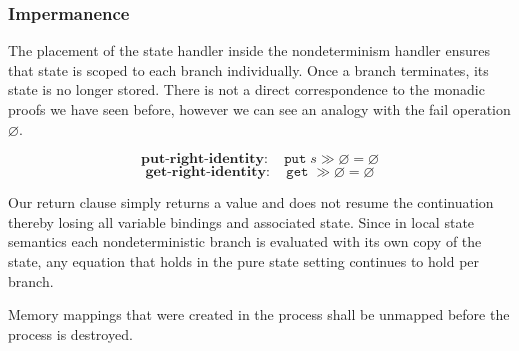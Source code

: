 \documentclass[logo,bsc,singlespacing,parskip]{infthesis}
\begin{document}
\subsubsection{Impermanence} 
The placement of the state handler inside the nondeterminism handler ensures that state is scoped to each branch individually. Once a branch terminates, its state is no longer stored. There is not a direct correspondence to the monadic proofs we have seen before, however we can see an analogy with the fail operation $\varnothing$. 

\[
\textbf{put-right-identity}: \quad \texttt{put}\;s \gg \varnothing = \varnothing
\]
\vspace{-1em}
\[
\textbf{get-right-identity}: \quad \texttt{get}\; \gg \varnothing = \varnothing
\]

Our return clause  simply returns a value and does not resume the continuation thereby losing all variable bindings and associated state. Since in local state semantics each nondeterministic branch is evaluated with its own copy of the state, any equation that holds in the pure state setting continues to hold per branch.



\begin{tcolorbox}[colback=gray!10, colframe=gray!60, sharp corners, boxrule=0.5pt, title={POSIX Base Specifications, Issue 7, p.554}]
Memory mappings that were created in the process shall be unmapped before the process
 is destroyed.
 \end{tcolorbox}
 
\end{document}
